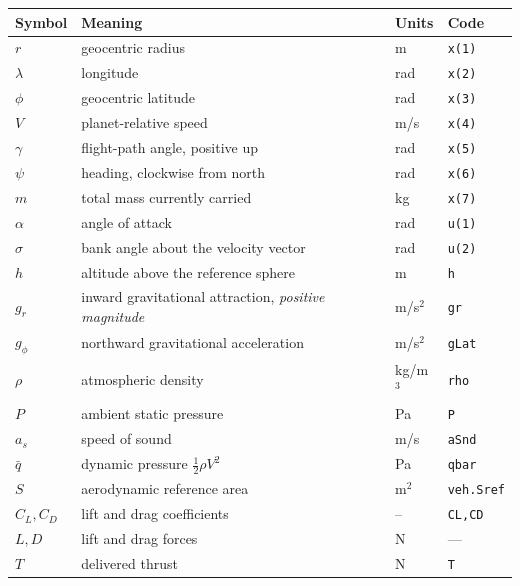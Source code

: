 \documentclass[11pt]{article}
\newcommand{\code}[1]{\texttt{#1}}
\begin{document}
\begin{center}
\begin{tabular}{llll}
\toprule
Symbol & Meaning & Units & Code \\
\midrule
$r$        & geocentric radius                        & m         & \code{x(1)} \\
$\lambda$  & longitude                                & rad       & \code{x(2)} \\
$\phi$     & geocentric latitude                      & rad       & \code{x(3)} \\
$V$        & planet-relative speed                    & m/s       & \code{x(4)} \\
$\gamma$   & flight-path angle, positive up           & rad       & \code{x(5)} \\
$\psi$     & heading, clockwise from north            & rad       & \code{x(6)} \\
$m$        & total mass currently carried             & kg        & \code{x(7)} \\
$\alpha$   & angle of attack                          & rad       & \code{u(1)} \\
$\sigma$   & bank angle about the velocity vector     & rad       & \code{u(2)} \\
$h$        & altitude above the reference sphere      & m         & \code{h} \\
$g_r$      & inward gravitational attraction, \emph{positive magnitude} & m/s$^2$ & \code{gr} \\
$g_\phi$   & northward gravitational acceleration     & m/s$^2$   & \code{gLat} \\
$\rho$     & atmospheric density                      & kg/m$^3$  & \code{rho} \\
$P$        & ambient static pressure                  & Pa        & \code{P} \\
$a_s$      & speed of sound                           & m/s       & \code{aSnd} \\
$\bar q$   & dynamic pressure $\tfrac12\rho V^2$      & Pa        & \code{qbar} \\
$S$        & aerodynamic reference area               & m$^2$     & \code{veh.Sref} \\
$C_L,C_D$  & lift and drag coefficients               & --        & \code{CL,CD} \\
$L,D$      & lift and drag forces                     & N         & --- \\
$T$        & delivered thrust                         & N         & \code{T} \\

\end{tabular}
\end{center}
\end{document}
